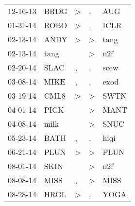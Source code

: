 \begin{supertabular}{p{0.07\textwidth}p{0.06\textwidth}p{0.02\textwidth}p{0.02\textwidth}p{0.06\textwidth}}
          12-16-13\textsuperscript{} &           BRDG\textsuperscript{} &     \textgreater &                , &            AUG\textsuperscript{} \\
          01-31-14\textsuperscript{} &           ROBO\textsuperscript{} &     \textgreater &                , &           ICLR\textsuperscript{} \\
          02-13-14\textsuperscript{} &           ANDY\textsuperscript{} &     \textgreater &     \textgreater &           tang\textsuperscript{} \\
          02-13-14\textsuperscript{} &           tang\textsuperscript{} &                  &     \textgreater &            n2f\textsuperscript{} \\
          02-20-14\textsuperscript{} &           SLAC\textsuperscript{} &                , &                , &           scew\textsuperscript{} \\
          03-08-14\textsuperscript{} &           MIKE\textsuperscript{} &                , &                , &           exod\textsuperscript{} \\
          03-19-14\textsuperscript{} &           CML8\textsuperscript{} &     \textgreater &     \textgreater &           SWTN\textsuperscript{} \\
          04-01-14\textsuperscript{} &           PICK\textsuperscript{} &                  &     \textgreater &           MANT\textsuperscript{} \\
          04-08-14\textsuperscript{} &           milk\textsuperscript{} &                  &     \textgreater &           SNUC\textsuperscript{} \\
          05-23-14\textsuperscript{} &           BATH\textsuperscript{} &                , &                , &           hiqi\textsuperscript{} \\
          06-21-14\textsuperscript{} &           PLUN\textsuperscript{} &     \textgreater &     \textgreater &           PLUN\textsuperscript{} \\
          08-01-14\textsuperscript{} &           SKIN\textsuperscript{} &                  &     \textgreater &            n2f\textsuperscript{} \\
          08-08-14\textsuperscript{} &           MISS\textsuperscript{} &                , &     \textgreater &           MISS\textsuperscript{} \\
          08-28-14\textsuperscript{} &           HRGL\textsuperscript{} &     \textgreater &                , &           YOGA\textsuperscript{} \\

\end{supertabular}
